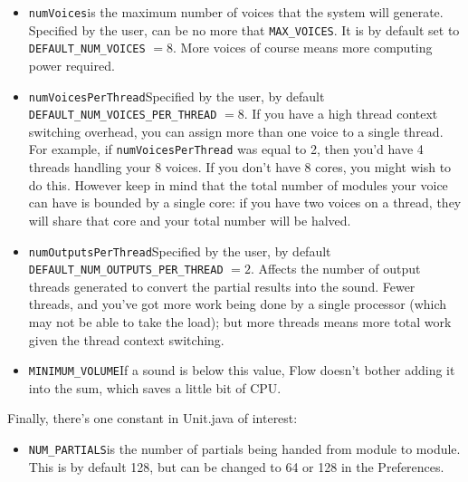 \documentclass{article}
\begin{document}
\begin{itemize}
\item {\tt numVoices}\qquad is the maximum number of voices that the system will generate.  Specified by the user, can be no more that {\tt MAX\_VOICES}. It is by default set to {\tt DEFAULT\_NUM\_VOICES} \(=8\).  More voices of course means more computing power required.

\item {\tt numVoicesPerThread}\qquad Specified by the user, by default {\tt DEFAULT\_NUM\_VOICES\_PER\_THREAD} \(=8\).  If you have a high thread context switching overhead, you can assign more than one voice to a single thread.  For example, if {\tt numVoicesPerThread} was equal to 2, then you'd have 4 threads handling your 8 voices.  If you don't have 8 cores, you might wish to do this.  However keep in mind that the total number of modules your voice can have is bounded by a single core: if you have two voices on a thread, they will share that core and your total number will be halved.

\item {\tt numOutputsPerThread}\qquad Specified by the user, by default {\tt DEFAULT\_NUM\_OUTPUTS\_PER\_THREAD} \(=2\).  Affects the number of output threads generated to convert the partial results into the sound.  Fewer threads, and you've got more work being done by a single processor (which may not be able to take the load); but more threads means more total work given the thread context switching.

\item {\tt MINIMUM\_VOLUME}\qquad If a sound is below this value, Flow doesn't bother adding it into the sum, which saves a little bit of CPU.

\end{itemize}

Finally, there's one constant in Unit.java of interest:

\begin{itemize}
\item {\tt NUM\_PARTIALS}\qquad is the number of partials being handed from module to module.  This is by default 128, but can be changed to 64 or 128 in the Preferences. 
\end{itemize}
\end{document}

